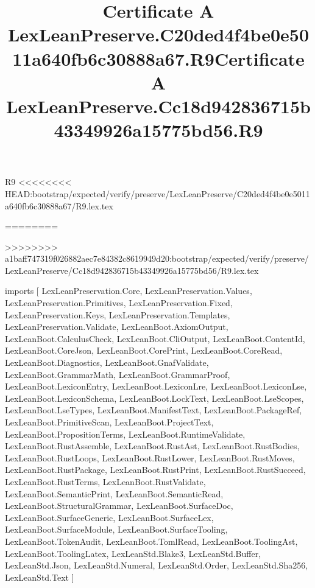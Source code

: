 \begin{lexlean}{R9}
<<<<<<<< HEAD:bootstrap/expected/verify/preserve/LexLeanPreserve/C20ded4f4be0e5011a640fb6c30888a67/R9.lex.tex
\title{Certificate A LexLeanPreserve.C20ded4f4be0e5011a640fb6c30888a67.R9}
========
\title{Certificate A LexLeanPreserve.Cc18d942836715b43349926a15775bd56.R9}
>>>>>>>> a1baff747319f026882aec7e84382c8619949d20:bootstrap/expected/verify/preserve/LexLeanPreserve/Cc18d942836715b43349926a15775bd56/R9.lex.tex
\begin{coremodule}
imports [
  LexLeanPreservation.Core,
  LexLeanPreservation.Values,
  LexLeanPreservation.Primitives,
  LexLeanPreservation.Fixed,
  LexLeanPreservation.Keys,
  LexLeanPreservation.Templates,
  LexLeanPreservation.Validate,
  LexLeanBoot.AxiomOutput,
  LexLeanBoot.CalculusCheck,
  LexLeanBoot.CliOutput,
  LexLeanBoot.ContentId,
  LexLeanBoot.CoreJson,
  LexLeanBoot.CorePrint,
  LexLeanBoot.CoreRead,
  LexLeanBoot.Diagnostics,
  LexLeanBoot.GnafValidate,
  LexLeanBoot.GrammarMath,
  LexLeanBoot.GrammarProof,
  LexLeanBoot.LexiconEntry,
  LexLeanBoot.LexiconLre,
  LexLeanBoot.LexiconLse,
  LexLeanBoot.LexiconSchema,
  LexLeanBoot.LockText,
  LexLeanBoot.LseScopes,
  LexLeanBoot.LseTypes,
  LexLeanBoot.ManifestText,
  LexLeanBoot.PackageRef,
  LexLeanBoot.PrimitiveScan,
  LexLeanBoot.ProjectText,
  LexLeanBoot.PropositionTerms,
  LexLeanBoot.RuntimeValidate,
  LexLeanBoot.RustAssemble,
  LexLeanBoot.RustAst,
  LexLeanBoot.RustBodies,
  LexLeanBoot.RustLoops,
  LexLeanBoot.RustLower,
  LexLeanBoot.RustMoves,
  LexLeanBoot.RustPackage,
  LexLeanBoot.RustPrint,
  LexLeanBoot.RustSucceed,
  LexLeanBoot.RustTerms,
  LexLeanBoot.RustValidate,
  LexLeanBoot.SemanticPrint,
  LexLeanBoot.SemanticRead,
  LexLeanBoot.StructuralGrammar,
  LexLeanBoot.SurfaceDoc,
  LexLeanBoot.SurfaceGeneric,
  LexLeanBoot.SurfaceLex,
  LexLeanBoot.SurfaceModule,
  LexLeanBoot.SurfaceTooling,
  LexLeanBoot.TokenAudit,
  LexLeanBoot.TomlRead,
  LexLeanBoot.ToolingAst,
  LexLeanBoot.ToolingLatex,
  LexLeanStd.Blake3,
  LexLeanStd.Buffer,
  LexLeanStd.Json,
  LexLeanStd.Numeral,
  LexLeanStd.Order,
  LexLeanStd.Sha256,
  LexLeanStd.Text
]


\end{coremodule}
\end{lexlean}
